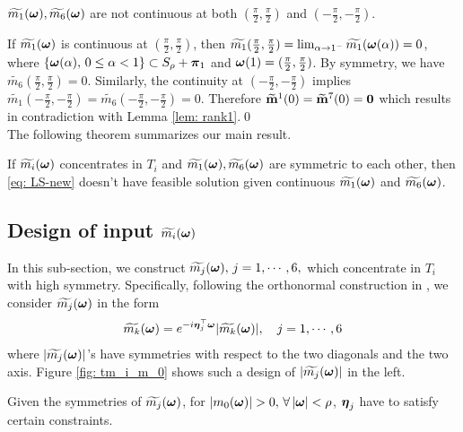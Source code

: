 \begin{proposition}
$\widetilde{m_{1}}(\boldsymbol{\omega}),\widetilde{m_{6}}(\boldsymbol{\omega})$ are not continuous at both $(\frac{\pi}{2},\frac{\pi}{2})$ and $(-\frac{\pi}{2},-\frac{\pi}{2})$.
\end{proposition}
If $\widetilde{m_{1}}(\boldsymbol{\omega})$ is continuous at $(\frac{\pi}{2},\frac{\pi}{2})$, then $\widetilde{m_1}(\frac{\pi}{2},\frac{\pi}{2}) = \lim_{\alpha\rightarrow 1^-}\widetilde{m_1}(\boldsymbol{\omega}(\alpha)) = 0$, where $\{\boldsymbol{\omega}(\alpha),\,0\leq \alpha<1\} \subset S_\rho + \boldsymbol{\pi}_1$ and $\boldsymbol{\omega}(1) = (\frac{\pi}{2},\frac{\pi}{2})$. By symmetry, we have $\widetilde{m_6}(\frac{\pi}{2},\frac{\pi}{2}) = 0$. Similarly, the continuity at $(-\frac{\pi}{2},-\frac{\pi}{2})$ implies $\widetilde{m_1}(-\frac{\pi}{2},-\frac{\pi}{2}) = \widetilde{m_6}(-\frac{\pi}{2},-\frac{\pi}{2}) = 0$. Therefore $\widetilde{\mathbf{m}}^{1}(0) = \widetilde{\mathbf{m}}^{7}(0) = \mathbf{0}$ which results in contradiction with Lemma \ref{lem: rank1}.\qed\\[1em]%
The following theorem summarizes our main result.
\begin{theorem}\label{thm: thm}
If  $\widetilde{m_{i}}(\boldsymbol{\omega})$ concentrates in $T_i$ and $\widetilde{m_{1}}(\boldsymbol{\omega}),\widetilde{m_{6}}(\boldsymbol{\omega})$ are symmetric to each other,  then  \eqref{eq: LS-new} doesn't have feasible solution given continuous $\widetilde{m_{1}}(\boldsymbol{\omega})$ and $\widetilde{m_{6}}(\boldsymbol{\omega})$.
\end{theorem}

\subsection{Design of input $\widetilde{m_{i}}(\boldsymbol{\omega})$}\label{sec: phase-design}
In this sub-section, we construct $\widetilde{m_{j}}(\boldsymbol{\omega}),\, j = 1,\cdots,6,$ which concentrate in $T_i$ with high symmetry.
Specifically, following the orthonormal construction in \cite{yin2014orthshear}, we consider $\widetilde{m_{j}}(\boldsymbol{\omega})$ in the form 
\begin{align}\label{eq: m-form}
\widetilde{m_{k}}(\boldsymbol{\omega}) = e^{-i\boldsymbol{\eta}_j^\top\boldsymbol{\omega}}|\widetilde{m_{k}}(\boldsymbol{\omega})|,\quad j = 1,\cdots,6
\end{align}
 where $|\widetilde{m_{j}}(\boldsymbol{\omega})|$'s have symmetries with respect to the two diagonals and the two axis. Figure \ref{fig: tm_i_m_0} shows such a design of $|\widetilde{m_{j}}(\boldsymbol{\omega})|$ in the left.
 
Given the symmetries of $\widetilde{m_{j}}(\boldsymbol{\omega})$, for $|m_0(\boldsymbol{\omega})| > 0,\, \forall\, |\boldsymbol{\omega}| < \rho$, $\boldsymbol{\eta}_j$ have to satisfy certain constraints.
 
